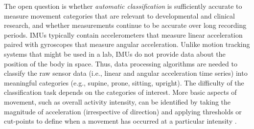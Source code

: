 \documentclass[
  man]{apa6}
\begin{document}
The open question is whether \emph{automatic classification} is sufficiently accurate to measure movement categories that are relevant to developmental and clinical research, and whether measurements continue to be accurate over long recording periods. IMUs typically contain accelerometers that measure linear acceleration paired with gyroscopes that measure angular acceleration. Unlike motion tracking systems that might be used in a lab, IMUs do not provide data about the position of the body in space. Thus, data processing algorithms are needed to classify the raw sensor data (i.e., linear and angular acceleration time series) into meaningful categories (e.g., supine, prone, sitting, upright). The difficulty of the classification task depends on the categories of interest. More basic aspects of movement, such as overall activity intensity, can be identified by taking the magnitude of acceleration (irrespective of direction) and applying thresholds or cut-points to define when a movement has occurred at a particular intensity \autocites[e.g.,][]{HagerTilton2017,ArmstrongCovington2019}.
\end{document}
